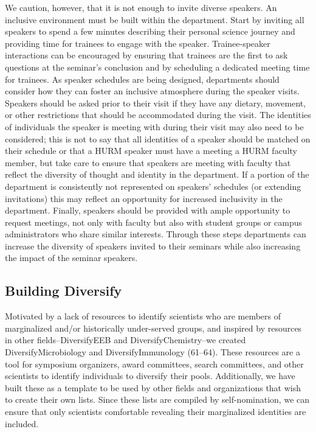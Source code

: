 \documentclass[10pt,]{article}
\begin{document}
We caution, however, that it is not enough to invite diverse speakers.
An inclusive environment must be built within the department. Start by
inviting all speakers to spend a few minutes describing their personal
science journey and providing time for trainees to engage with the
speaker. Trainee-speaker interactions can be encouraged by ensuring that
trainees are the first to ask questions at the seminar's conclusion and
by scheduling a dedicated meeting time for trainees. As speaker
schedules are being designed, departments should consider how they can
foster an inclusive atmosphere during the speaker visits. Speakers
should be asked prior to their visit if they have any dietary, movement,
or other restrictions that should be accommodated during the visit. The
identities of individuals the speaker is meeting with during their visit
may also need to be considered; this is not to say that all identities
of a speaker should be matched on their schedule or that a HURM speaker
must have a meeting a HURM faculty member, but take care to ensure that
speakers are meeting with faculty that reflect the diversity of thought
and identity in the department. If a portion of the department is
consistently not represented on speakers' schedules (or extending
invitations) this may reflect an opportunity for increased inclusivity
in the department. Finally, speakers should be provided with ample
opportunity to request meetings, not only with faculty but also with
student groups or campus administrators who share similar interests.
Through these steps departments can increase the diversity of speakers
invited to their seminars while also increasing the impact of the
seminar speakers.

\subsection{Building Diversify}\label{building-diversify}

Motivated by a lack of resources to identify scientists who are members
of marginalized and/or historically under-served groups, and inspired by
resources in other fields--DiversifyEEB and DiversifyChemistry--we
created DiversifyMicrobiology and DiversifyImmunology (61--64). These
resources are a tool for symposium organizers, award committees, search
committees, and other scientists to identify individuals to diversify
their pools. Additionally, we have built these as a template to be used
by other fields and organizations that wish to create their own lists.
Since these lists are compiled by self-nomination, we can ensure that
only scientists comfortable revealing their marginalized identities are
included.
\end{document}
